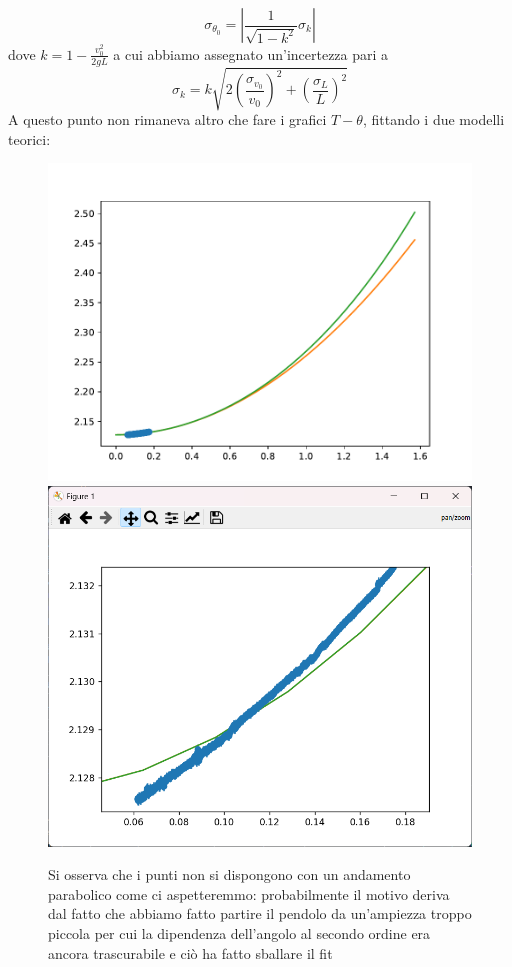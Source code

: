\documentclass{article}
\begin{document}
$$
	\sigma_{\theta_0} = \left| {\frac{1}{\sqrt{1-k^2}}\sigma_k} \right|
$$
\noindent dove $k = 1-\frac{v_0^2}{2gL}$ a cui abbiamo assegnato un'incertezza pari a
$$	
	\sigma_k = k \sqrt{ 2 \left(\frac{\sigma_{v_0}}{v_0} \right)^2 + \left(\frac{\sigma_L}{L} \right)^2}
$$
A questo punto non rimaneva altro che fare i grafici $T-\theta$, fittando i due modelli teorici:
\begin{figure}
	\centering
	\includegraphics[scale=0.60]{Fit_piccola_ampiezza.pdf} \\
	\includegraphics[scale=0.50]{zoom_piccole_ampiezze.png}
	\caption{Si osserva che i punti non si dispongono con un andamento parabolico come ci aspetteremmo: probabilmente il motivo deriva dal fatto che abbiamo fatto partire il pendolo da un'ampiezza troppo piccola per cui la dipendenza dell'angolo al secondo ordine era ancora trascurabile e ciò ha fatto sballare il fit}
\end{figure}
\end{document}
